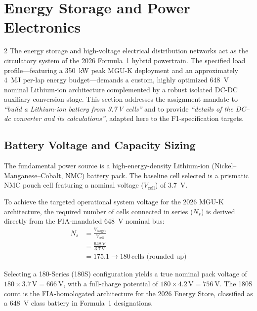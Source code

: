 \section{Energy Storage and Power Electronics}

\begin{multicols}{2}
The energy storage and high-voltage electrical distribution networks act as the circulatory system of the 2026 Formula~1 hybrid powertrain. The specified load profile---featuring a \SI{350}{\kilo\watt} peak MGU-K deployment and an approximately \SI{4}{\mega\joule} per-lap energy budget---demands a custom, highly optimized \SI{648}{\volt} nominal Lithium-ion architecture complemented by a robust isolated DC-DC auxiliary conversion stage. This section addresses the assignment mandate to \textit{``build a Lithium-ion battery from 3.7\,V cells''} and to provide \textit{``details of the DC--dc converter and its calculations''}, adapted here to the F1-specification targets.

\subsection{Battery Voltage and Capacity Sizing}

The fundamental power source is a high-energy-density Lithium-ion (Nickel--Manganese--Cobalt, NMC) battery pack. The baseline cell selected is a prismatic NMC pouch cell featuring a nominal voltage ($V_{\text{cell}}$) of \SI{3.7}{\volt}.

To achieve the targeted operational system voltage for the 2026 MGU-K architecture, the required number of cells connected in series ($N_s$) is derived directly from the FIA-mandated \SI{648}{\volt} nominal bus:
\begin{equation} \label{eq:series_config}
\begin{split}
N_s &= \frac{V_{\text{target}}}{V_{\text{cell}}} \\
&= \frac{648\,\mathrm{V}}{3.7\,\mathrm{V}} \\
&= 175.1 \rightarrow 180\,\text{cells (rounded up)}
\end{split}
\end{equation}

Selecting a 180-Series (180S) configuration yields a true nominal pack voltage of $180 \times 3.7\,\mathrm{V} = \SI{666}{\volt}$, with a full-charge potential of $180 \times 4.2\,\mathrm{V} = \SI{756}{\volt}$. The 180S count is the FIA-homologated architecture for the 2026 Energy Store, classified as a \SI{648}{\volt} class battery in Formula~1 designations.


\end{multicols}
